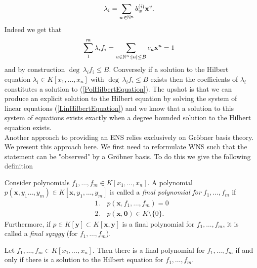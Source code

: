$$\lambda_i = \sum_{w\in \mathbb{N}^n} b_w^{(i)}\mathbf{x}^v.$$
Indeed we get that 
$$\sum_1^m \lambda_i f_i = \sum_{u\in \mathbb{N}^n : \vert u\vert \leq B} c_u \mathbf{x}^u = 1$$
and by construction $\deg \ \lambda_i f_i \leq B.$ Conversely if a solution to the Hilbert equation $\lambda_i\in K[x_1,\dots,x_n]$ with $\deg \ \lambda_i f_i \leq B$ exists then the coefficients of $\lambda_i$ constitutes a solution to (\ref{PolHilbertEquation}). The upshot is that we can produce an explicit solution to the Hilbert equation by solving the system of linear equations (\ref{LinHilbertEquation}) and we know that a solution to this system of equations exists exactly when a degree bounded solution to the Hilbert equation exists.\\

Another approach to providing an ENS relies exclusively on Gröbner basis theory. We present this approach here. We first need to reformulate WNS such that the statement can be "observed" by a Gröbner basis. To do this we give the following definition
\begin{definition}\label{FinPol : 1}
    Consider polynomials $f_1,\dots,f_m\in K[x_1,\dots,x_n]$. A polynomial $p(\mathbf{x},y_1\dots,y_m) \in K[\mathbf{x},y_1,\dots,y_m]$ is called a \textit{final polynomial for} $f_1,\dots,f_m$ if 
    \begin{align*}
        &1.\quad p(\mathbf{x}, f_1,\dots, f_m) = 0\\
        &2. \quad p(\mathbf{x},\mathbf{0}) \in  K\setminus\{0\}.
    \end{align*}
    Furthermore, if $p\in K[\mathbf{y}]\subset K[\mathbf{x},\mathbf{y}]$ is a final polynomial for $f_1,\dots,f_m$, it is called a \textit{final syzygy} (for $f_1,\dots,f_m$).
\end{definition}
\begin{lemma}
    Let $f_1,\dots,f_m\in K[x_1,\dots,x_n]$. Then there is a final polynomial for $f_1,\dots,f_m$ if and only if there is a solution to the Hilbert equation for $f_1,\dots,f_m$.
\end{lemma}
